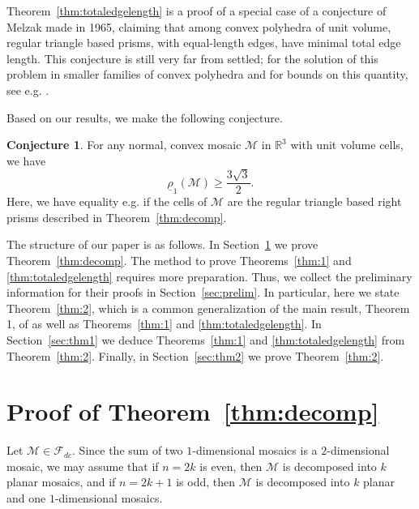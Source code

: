 \documentclass[twoside]{amsart}
\theoremstyle{definition}
\newtheorem{conj}{Conjecture}
\renewcommand{\Re}{\mathbb R}
\newcommand{\M}{\mathcal{M}}
\newcommand{\F}{\mathcal{F}}
\begin{document}
Theorem~\ref{thm:totaledgelength} is a proof of a special case of a conjecture of Melzak \cite{Melzak} made in 1965, claiming that among convex polyhedra of unit volume, regular triangle based prisms, with equal-length edges, have minimal total edge length. This conjecture is still very far from settled; for the solution of this problem in smaller families of convex polyhedra and for bounds on this quantity, see e.g. \cite{Abe63, Abe73, Be57, FejesToth, Melzak2}.

Based on our results, we make the following conjecture.


\begin{conj}\label{conj:edgedensity}
For any normal, convex mosaic $\M$ in $\Re^3$ with unit volume cells, we have
\[
\underline{\rho}_1(\M) \geq \frac{3\sqrt{3}}{2}.
\]
Here, we have equality e.g. if the cells of $\M$ are the regular triangle based right prisms described in Theorem~\ref{thm:decomp}.
\end{conj} 

The structure of our paper is as follows. In Section~\ref{sec:decomp} we prove Theorem~\ref{thm:decomp}. The method to prove Theorems~\ref{thm:1} and \ref{thm:totaledgelength} requires more preparation. Thus, we collect the preliminary information for their proofs in Section~\ref{sec:prelim}. In particular, here we state Theorem~\ref{thm:2}, which is a common generalization of the main result, Theorem 1, of \cite{Langi} as well as Theorems~\ref{thm:1} and \ref{thm:totaledgelength}. In Section~\ref{sec:thm1}  we deduce Theorems~\ref{thm:1} and \ref{thm:totaledgelength} from Theorem~\ref{thm:2}. Finally, in Section~\ref{sec:thm2} we prove Theorem~\ref{thm:2}.




\section{Proof of Theorem~\ref{thm:decomp}}\label{sec:decomp}

Let $\M \in \F_{dc}$. Since the sum of two $1$-dimensional mosaics is a $2$-dimensional mosaic, we may assume that if $n=2k$ is even, then $\M$ is decomposed into $k$ planar mosaics, and if $n=2k+1$ is odd, then $\M$ is decomposed into $k$ planar and one $1$-dimensional mosaics.
\end{document}
